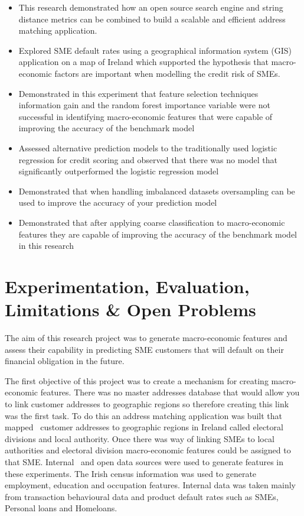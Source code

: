 \begin{itemize}
	\item This research demonstrated how an open source search engine and string distance metrics can be combined to build a scalable and efficient address matching application.
	
	\item Explored SME default rates using a geographical information system (GIS) application on a map of Ireland which supported the hypothesis that macro-economic factors are important when modelling the credit risk of SMEs.
	
	\item Demonstrated in this experiment that feature selection techniques  information gain and the random forest importance variable were not successful in identifying macro-economic features that were capable of improving the accuracy of the benchmark model   
	
	\item Assessed alternative prediction models to the traditionally used logistic regression for credit scoring and observed that there was no model that significantly outperformed the logistic regression model
	
	\item Demonstrated that when handling imbalanced datasets oversampling can be used to improve the accuracy of your prediction model
	
	\item Demonstrated that after applying coarse classification to macro-economic features they are capable of improving the accuracy of the benchmark model in this research
\end{itemize}

\section{Experimentation, Evaluation, Limitations \& Open Problems}
The aim of this research project was to generate macro-economic features and assess their capability in predicting SME customers that will default on their financial obligation in the future. 

The first objective of this project was to create a mechanism for creating macro-economic features. There was no master addresses database that would allow you to link customer addresses to geographic regions so therefore creating this link was the first task. To do this an address matching application was built that mapped \subjectname\ customer addresses to geographic regions in Ireland called electoral divisions and local authority. Once there was way of linking SMEs to local authorities and electoral division macro-economic features could be assigned to that SME. Internal \subjectname\ and open data sources were used to generate features in these experiments. The Irish census information was used to generate employment, education and occupation features. Internal data was taken mainly from transaction behavioural data and product default rates such as SMEs, Personal loans and Homeloans.  

